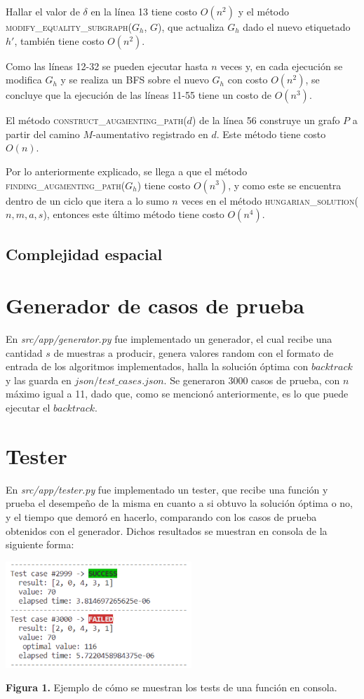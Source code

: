\documentclass[10pt]{article} %
\begin{document}
Hallar el valor de $\delta$ en la l\'inea 13 tiene costo $O(n^2)$ y el m\'etodo \textsc{modify\_equality\_subgraph($G_h$, $G$)}, que actualiza $G_h$ dado el nuevo etiquetado $h'$, tambi\'en tiene costo $O(n^2)$. 

Como las l\'ineas 12-32 se pueden ejecutar hasta $n$ veces y, en cada ejecuci\'on se modifica $G_h$ y se realiza un BFS sobre el nuevo $G_h$ con costo $O(n^2)$, se concluye que la ejecuci\'on de las l\'ineas 11-55 tiene un costo de $O(n^3)$.

El m\'etodo \textsc{construct\_augmenting\_path($d$)} de la l\'inea 56 construye un grafo $P$ a partir del camino $M$-aumentativo registrado en $d$. Este m\'etodo tiene costo $O(n)$. 

Por lo anteriormente explicado, se llega a que el m\'etodo \textsc{finding\_augmenting\_path($G_h$)} tiene costo $O(n^3)$, y como este se encuentra dentro de un ciclo que itera a lo sumo $n$ veces en el m\'etodo \textsc{hungarian\_solution($n,m,a,s$)}, entonces este \'ultimo m\'etodo tiene costo $O(n^4)$.
	
	\subsection{Complejidad espacial}
	
	\section{Generador de casos de prueba}
	
	En \textit{src/app/generator.py} fue implementado un generador, el cual recibe una cantidad $ s $ de muestras a producir, genera valores random con el formato de entrada de los algoritmos implementados, halla la soluci\'on \'optima con $ backtrack $ y las guarda en $ json/test\_cases.json $. Se generaron 3000 casos de prueba, con $ n $ m\'aximo igual a 11, dado que, como se mencion\'o anteriormente, es lo que puede ejecutar el $ backtrack $.
	
	\section{Tester}
	 En \textit{src/app/tester.py} fue implementado un tester, que recibe una funci\'on y prueba el desempe\~no de la misma en cuanto a si obtuvo la soluci\'on \'optima o no, y el tiempo que demor\'o en hacerlo, comparando con los casos de prueba obtenidos con el generador. Dichos resultados se muestran en consola de la siguiente forma:
	 	 \begin{center}
	 		\includegraphics[width=7cm]{tester_sample.png}
	 		
	 		\tiny{\textbf{Figura 1.} Ejemplo de c\'omo se muestran los tests de una funci\'on en consola.} 
	 	\end{center}
 	 
\end{document}

